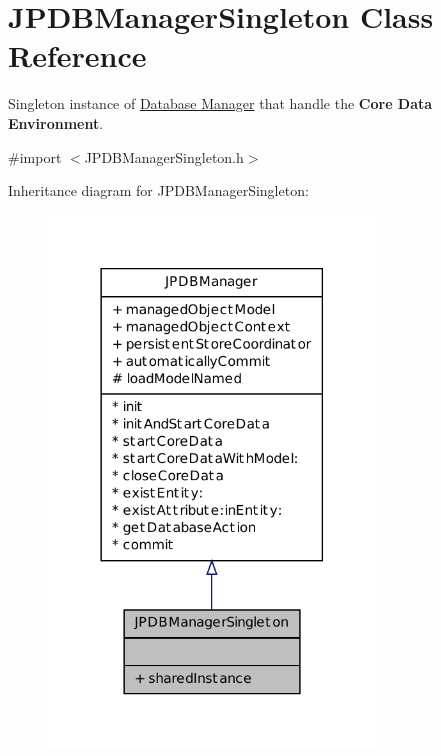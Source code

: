 \hypertarget{interface_j_p_d_b_manager_singleton}{
\section{JPDBManagerSingleton Class Reference}
\label{interface_j_p_d_b_manager_singleton}
}


Singleton instance of \hyperlink{interface_j_p_d_b_manager}{Database Manager} that handle the {\bfseries Core Data Environment}.  




{\ttfamily \#import $<$JPDBManagerSingleton.h$>$}



Inheritance diagram for JPDBManagerSingleton:
\nopagebreak
\begin{figure}[H]
\begin{center}
\leavevmode
\includegraphics[width=246pt]{interface_j_p_d_b_manager_singleton__inherit__graph}
\end{center}
\end{figure}


